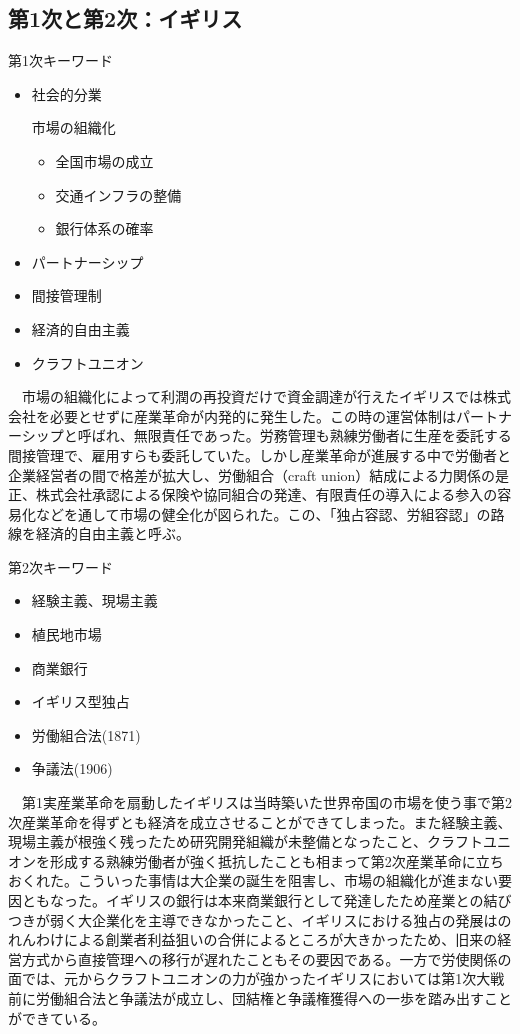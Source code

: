 \documentclass{jsarticle}
\begin{document}
\subsection{第1次と第2次：イギリス}
第1次キーワード
\begin{itemize}
\item 社会的分業

市場の組織化
	\begin{itemize}
	\item 全国市場の成立
	\item 交通インフラの整備
	\item 銀行体系の確率
	\end{itemize}
\item パートナーシップ
\item 間接管理制
\item 経済的自由主義
\item クラフトユニオン
\end{itemize}
　市場の組織化によって利潤の再投資だけで資金調達が行えたイギリスでは株式会社を必要とせずに産業革命が内発的に発生した。この時の運営体制はパートナーシップと呼ばれ、無限責任であった。労務管理も熟練労働者に生産を委託する間接管理で、雇用すらも委託していた。しかし産業革命が進展する中で労働者と企業経営者の間で格差が拡大し、労働組合（craft union）結成による力関係の是正、株式会社承認による保険や協同組合の発達、有限責任の導入による参入の容易化などを通して市場の健全化が図られた。この、「独占容認、労組容認」の路線を経済的自由主義と呼ぶ。

第2次キーワード
\begin{itemize}
\item 経験主義、現場主義
\item 植民地市場
\item 商業銀行
\item イギリス型独占
\item 労働組合法(1871)
\item 争議法(1906)
\end{itemize}
　第1実産業革命を扇動したイギリスは当時築いた世界帝国の市場を使う事で第2次産業革命を得ずとも経済を成立させることができてしまった。また経験主義、現場主義が根強く残ったため研究開発組織が未整備となったこと、クラフトユニオンを形成する熟練労働者が強く抵抗したことも相まって第2次産業革命に立ちおくれた。こういった事情は大企業の誕生を阻害し、市場の組織化が進まない要因ともなった。イギリスの銀行は本来商業銀行として発達したため産業との結びつきが弱く大企業化を主導できなかったこと、イギリスにおける独占の発展はのれんわけによる創業者利益狙いの合併によるところが大きかったため、旧来の経営方式から直接管理への移行が遅れたこともその要因である。一方で労使関係の面では、元からクラフトユニオンの力が強かったイギリスにおいては第1次大戦前に労働組合法と争議法が成立し、団結権と争議権獲得への一歩を踏み出すことができている。
\end{document}
